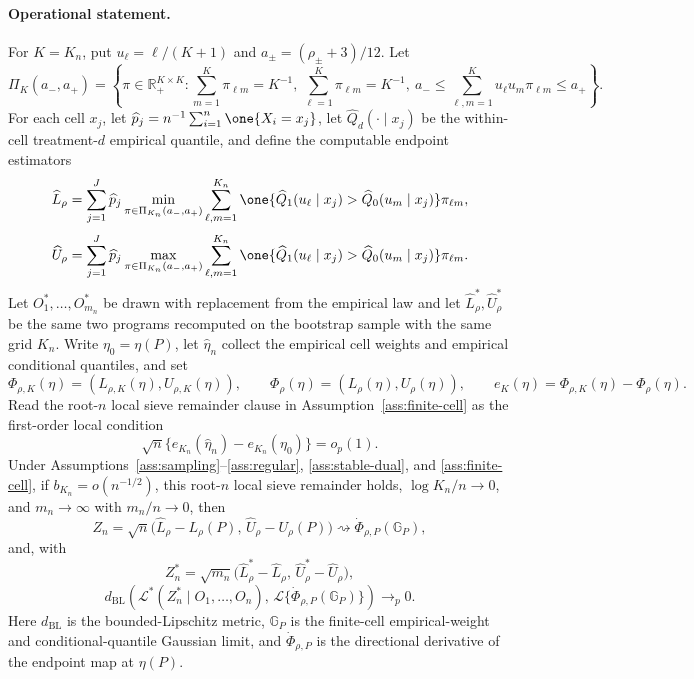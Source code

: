 \begin{theorem}
\paragraph{Operational statement.}
For \(K=K_n\), put \(u_\ell=\ell/(K+1)\) and \(a_\pm=(\rho_\pm+3)/12\).  Let
\[
\Pi_K(a_-,a_+)=\left\{\pi\in\mathbb R_+^{K\times K}:
\sum_{m=1}^K\pi_{\ell m}=K^{-1},\
\sum_{\ell=1}^K\pi_{\ell m}=K^{-1},\
a_-\le\sum_{\ell,m=1}^K u_\ell u_m\pi_{\ell m}\le a_+
\right\}.
\]
For each cell \(x_j\), let \(\widehat p_j=n^{-1}\sum_{i=1}^n\one\{X_i=x_j\}\), let \(\widehat Q_d(\cdot\mid x_j)\) be the within-cell treatment-\(d\) empirical quantile, and define the computable endpoint estimators
\[
\widehat L_\rho=\sum_{j=1}^J\widehat p_j
\min_{\pi\in\Pi_{K_n}(a_-,a_+)}
\sum_{\ell,m=1}^{K_n}
\one\{\widehat Q_1(u_\ell\mid x_j)>\widehat Q_0(u_m\mid x_j)\}\pi_{\ell m},
\]
\[
\widehat U_\rho=\sum_{j=1}^J\widehat p_j
\max_{\pi\in\Pi_{K_n}(a_-,a_+)}
\sum_{\ell,m=1}^{K_n}
\one\{\widehat Q_1(u_\ell\mid x_j)>\widehat Q_0(u_m\mid x_j)\}\pi_{\ell m}.
\]
Let \(O_1^*,\ldots,O_{m_n}^*\) be drawn with replacement from the empirical law and let \(\widehat L_\rho^*,\widehat U_\rho^*\) be the same two programs recomputed on the bootstrap sample with the same grid \(K_n\).  Write \(\eta_0=\eta(P)\), let \(\widehat\eta_n\) collect the empirical cell weights and empirical conditional quantiles, and set
\[
\Phi_{\rho,K}(\eta)=(L_{\rho,K}(\eta),U_{\rho,K}(\eta)),\qquad
\Phi_\rho(\eta)=(L_\rho(\eta),U_\rho(\eta)),\qquad
e_K(\eta)=\Phi_{\rho,K}(\eta)-\Phi_\rho(\eta).
\]
Read the root-\(n\) local sieve remainder clause in Assumption~\ref{ass:finite-cell} as the first-order local condition
\[
\sqrt n\{e_{K_n}(\widehat\eta_n)-e_{K_n}(\eta_0)\}=o_p(1).
\]
Under Assumptions~\ref{ass:sampling}--\ref{ass:regular}, \ref{ass:stable-dual}, and \ref{ass:finite-cell}, if \(b_{K_n}=o(n^{-1/2})\), this root-\(n\) local sieve remainder holds, \(\log K_n/n\to0\), and \(m_n\to\infty\) with \(m_n/n\to0\), then
\[
Z_n=\sqrt n\bigl(\widehat L_\rho-L_\rho(P),\,\widehat U_\rho-U_\rho(P)\bigr)
\rightsquigarrow \dot\Phi_{\rho,P}(\mathbb G_P),
\]
and, with
\[
Z_n^*=\sqrt{m_n}\bigl(\widehat L_\rho^*-\widehat L_\rho,\,
\widehat U_\rho^*-\widehat U_\rho\bigr),
\]
\[
d_{\mathrm{BL}}\!\left(\mathcal L^*(Z_n^*\mid O_1,\ldots,O_n),\,
\mathcal L\{\dot\Phi_{\rho,P}(\mathbb G_P)\}\right)\to_p0.
\]
Here \(d_{\mathrm{BL}}\) is the bounded-Lipschitz metric, \(\mathbb G_P\) is the finite-cell empirical-weight and conditional-quantile Gaussian limit, and \(\dot\Phi_{\rho,P}\) is the directional derivative of the endpoint map at \(\eta(P)\).


\end{theorem}
